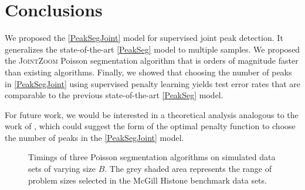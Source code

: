 \documentclass{article} %
\begin{document}
\section{Conclusions}

We proposed the \ref{PeakSegJoint} model for supervised joint peak
detection. It generalizes the state-of-the-art \ref{PeakSeg} model to
multiple samples. We proposed the \textsc{JointZoom} Poisson
segmentation algorithm that is orders of magnitude faster than
existing algorithms. Finally, we showed that choosing the number of
peaks in \ref{PeakSegJoint} using supervised penalty learning yields
test error rates that are comparable to the previous state-of-the-art
\ref{PeakSeg} model.

For future work, we would be interested in a theoretical analysis
analogous to the work of \citet{cleynen2013segmentation}, which could
suggest the form of the optimal penalty function to choose the number
of peaks in the \ref{PeakSegJoint} model.

\begin{figure}[b!]
  \centering
  
  \vskip -0.5cm
  \caption{Timings of three Poisson segmentation algorithms on
    simulated data sets of varying size $B$. The grey shaded area
    represents the range of problem sizes selected in the McGill
    Histone benchmark data sets. }
  \label{fig:timings}
\end{figure}

\newpage




\end{document}
